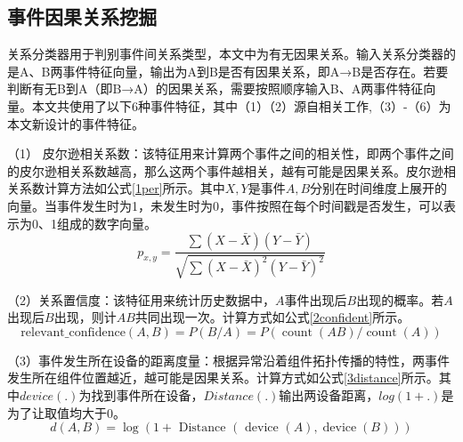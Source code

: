 

\subsection{事件因果关系挖掘}
关系分类器用于判别事件间关系类型，本文中为有无因果关系。输入关系分类器的是A、B两事件特征向量，输出为A到B是否有因果关系，即A→B是否存在。若要判断有无B到A（即B→A）的因果关系，需要按照顺序输入B、A两事件特征向量。本文共使用了以下6种事件特征，其中（1）（2）源自相关工作\cite{nie2016mining-causality-graph},（3）-（6）为本文新设计的事件特征。

（1） 皮尔逊相关系数：该特征用来计算两个事件之间的相关性，即两个事件之间的皮尔逊相关系数越高，那么这两个事件越相关，越有可能是因果关系。皮尔逊相关系数计算方法如公式\ref{1per}所示。其中$X,Y$是事件$A,B$分别在时间维度上展开的向量。当事件发生时为1，未发生时为0，事件按照在每个时间戳是否发生，可以表示为0、1组成的数字向量。
\begin{equation}
    p_{x, y}=\frac{\sum(X-\bar{X})(Y-\bar{Y})}{\sqrt{\sum(X-\bar{X})^{2}(Y-\bar{Y})^{2}}}\label{1per}
\end{equation}

（2）关系置信度：该特征用来统计历史数据中，$A$事件出现后$B$出现的概率。若$A$出现后$B$出现，则计$AB$共同出现一次。计算方式如公式\ref{2confident}所示。
\begin{equation}
    \operatorname{{ relevant }\_{confidence }}(A, B)=P(B/A)=P(\operatorname{count}(A B) / \operatorname{count}(A))\label{2confident}
\end{equation}

（3）事件发生所在设备的距离度量：根据异常沿着组件拓扑传播的特性，两事件发生所在组件位置越近，越可能是因果关系。计算方式如公式\ref{3distance}所示。其中$device(.)$为找到事件所在设备，$Distance(.)$输出两设备距离，$log(1+.)$是为了让取值均大于0。
\begin{equation}
    d(A, B)=\log (1+\text { Distance }(\text { device }(A), \operatorname{device}(B)))\label{3distance}
\end{equation}


